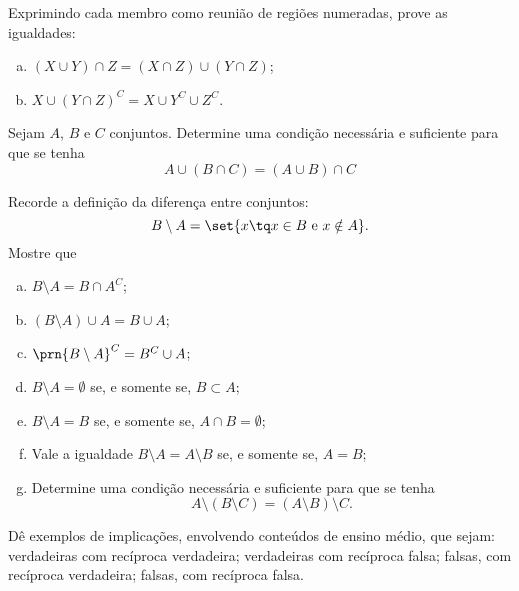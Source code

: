 \begin{exercise}
Exprimindo cada membro como reunião de regiões numeradas, prove
as igualdades:
\begin{enumerate}[a.]
  \item $\left(X \cup Y \right)\cap Z = \left(X \cap Z \right) \cup \left(Y \cap Z
  \right)$;
  \item $X \cup \left(Y \cap Z \right)^C = X \cup Y^C \cup Z^C$.
\end{enumerate}
\end{exercise}

\begin{exercise}
Sejam $A$, $B$ e $C$ conjuntos. Determine uma condição necessária e
suficiente para que se tenha 
	$$A \cup \left( B \cap C \right) = \left(A \cup B \right) \cap C$$
\end{exercise}

\begin{exercise}
Recorde a definição da diferença entre conjuntos:
  $$B \setminus A = \set {x \tq x \in B \text { e } x \notin A}.$$
  Mostre que
    \begin{enumerate}[a.]
      \item $B \setminus A = B \cap A^C$;
      \item $(B \setminus A)\cup A = B \cup A$;
      \item $\prn{B \setminus A}^C = B^C\cup A$;
      \item $B \setminus A = \emptyset$ se, e somente se, $B \subset
      A$;
      \item $B \setminus A = B$ se, e somente se, $A \cap B =
      \emptyset$;
      \item Vale a igualdade $B \setminus A = A \setminus B$ se, e
      somente se, $A = B$;
      \item Determine uma condição necessária e suficiente para que
      se tenha $$A \setminus \left(B \setminus C \right) = \left(A
      \setminus B \right) \setminus C.$$
    \end{enumerate}
\end{exercise}

\begin{exercise}
Dê exemplos de implicações, envolvendo conteúdos de ensino
  médio, que sejam: verdadeiras com recíproca verdadeira;
  verdadeiras com recíproca falsa; falsas, com recíproca verdadeira;
  falsas, com recíproca falsa.
\end{exercise}


